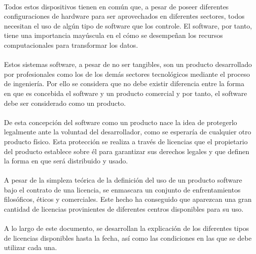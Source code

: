 \documentclass[10pt]{article}
\begin{document}
        \paragraph{}
        Todos estos dispositivos tienen en común que, a pesar de poseer diferentes configuraciones de hardware para ser aprovechados en diferentes sectores, todos necesitan el uso de algún tipo de software que los controle. El software, por tanto, tiene una importancia mayúscula en el cómo se desempeñan los recursos computacionales para transformar los datos.
        
        \paragraph{}
        Estos sistemas software, a pesar de no ser tangibles, son un producto desarrollado por profesionales como los de los demás sectores tecnológicos mediante el proceso de ingeniería. Por ello se considera que no debe existir diferencia entre la forma en que es concebida el software y un producto comercial y por tanto, el software debe ser considerado como un producto.
        
        \paragraph{}
        De esta concepción del software como un producto nace la idea de protegerlo legalmente ante la voluntad del desarrollador, como se esperaría de cualquier otro producto físico. Esta protección se realiza a través de licencias que el propietario del producto establece sobre él para garantizar sus derechos legales y que definen la forma en que será distribuido y usado.
        
        \paragraph{}
        A pesar de la simpleza teórica de la definición del uso de un producto software  bajo el contrato de una licencia, se enmascara un conjunto de enfrentamientos filosóficos, éticos y comerciales. Este hecho ha conseguido que aparezcan una gran cantidad de licencias provinientes de diferentes centros disponibles para su uso.
        
        \paragraph{}
        A lo largo de este documento, se desarrollan la explicación de los diferentes tipos de licencias disponibles hasta la fecha, así como las condiciones en las que se debe utilizar cada una.
        
\end{document}
